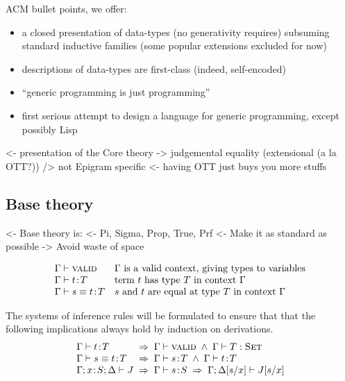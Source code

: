 \documentclass[preprint, authoryear, onecolumn]{sigplanconf}
\newenvironment{structure}{\footnotesize\verbatim}{\endverbatim}
\begin{document}
ACM bullet points, we offer:
\begin{itemize}
\item a closed presentation of data-types (no generativity requires)
  subsuming standard inductive families (some popular extensions
  excluded for now)
\item descriptions of data-types are first-class (indeed,
  self-encoded)
\item ``generic programming is just programming''
\item first serious attempt to design a language for generic
  programming, except possibly Lisp
\end{itemize}

\begin{structure}
<- presentation of the Core theory
    -> judgemental equality (extensional (a la OTT?))
    /> not Epigram specific 
        <- having OTT just buys you more stuffs
\end{structure}


\subsection{Base theory}

\begin{structure}
<- Base theory is:
    <- Pi, Sigma, Prop, True, Prf
<- Make it as standard as possible
    -> Avoid waste of space
\end{structure}

\[
\begin{array}{ll}
\Gamma\vdash\textsc{valid} & \mbox{\(\Gamma\) is a valid context, giving types to
                    variables} \\
\Gamma\vdash t\!:\!T & \mbox{term \(t\) has type \(T\) in context \(\Gamma\)} \\
\Gamma\vdash s \equiv t\!:\!T & \mbox{\(s\) and \(t\) are equal at type \(T\)
   in context \(\Gamma\)} \\
\end{array}
\]

The systems of inference rules will be formulated to ensure that that the
following implications always hold by induction on derivations.
\[
\begin{array}{l@{\;\;\Rightarrow\;\;}l}
\Gamma\vdash \Bhab{t}{T}            & \Gamma\vdash\Valid \;\wedge\; \Gamma\vdash\Type{T} \\
\Gamma\vdash s \equiv \Bhab{t}{T}   & \Gamma\vdash \Bhab{s}{T} \;\wedge\; \Gamma\vdash \Bhab{t}{T} \\
\Gamma;\xS;\Delta \vdash J          & \Gamma\vdash \Bhab{s}{S} \;\Rightarrow\; 
                                           \Gamma;\Delta[s/x] \vdash J[s/x] \\
\end{array}
\]
\end{document}
